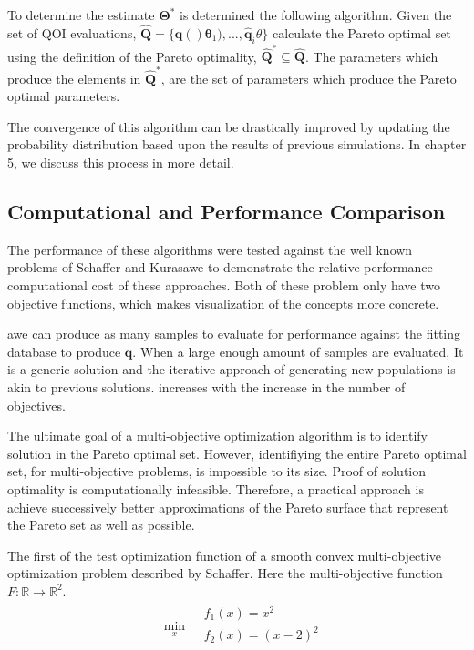To determine the estimate $\bm{\Theta}^*$ is determined the following algorithm.  Given the set of QOI evaluations, $\hat{\bm{Q}}=\{\hat{\bm{q}}()\bm{\theta}_1),...,\hat{\bm{q}}_i{\theta}\}$ calculate the Pareto optimal set using the definition of the Pareto optimality, $\hat{\bm{Q}}^* \subseteq \hat{\bm{Q}}$.   The parameters which produce the elements in $\hat{\bm{Q}}^*$, are the set of parameters which produce the Pareto optimal parameters.

The convergence of this algorithm can be drastically improved by updating the probability distribution based upon the results of previous simulations.  In chapter 5, we discuss this process in more detail.

\subsection{Computational and Performance Comparison}
 The performance of these algorithms were tested against the well known problems of Schaffer\cite{schaffer1984_pareto} and Kurasawe\cite{kursawe1001_pareto} to demonstrate the relative performance computational cost of these approaches.  Both of these problem only have two objective functions, which makes visualization of the concepts more concrete.

 awe can produce as many samples to evaluate for performance against the fitting database to produce $\bm{q}.$  When a large enough amount of samples are evaluated,
 It is a generic solution and the iterative approach of generating new populations is akin to previous solutions.
 increases with the increase in the number of objectives.

 The ultimate goal of a multi-objective optimization algorithm is to identify solution in the Pareto optimal set.  However, identifiying the entire Pareto optimal set, for multi-objective problems, is impossible to its size.  Proof of solution optimality is computationally infeasible.  Therefore, a practical approach is achieve successively better approximations of the Pareto surface that represent the Pareto set as well as possible.

 The first of the test optimization function of a smooth convex multi-objective optimization problem described by Schaffer\cite{schaffer1984_pareto}.  Here the multi-objective function $F:\mathbb{R} \rightarrow \mathbb{R}^2$.
 \begin{equation}
 \begin{aligned}
   &\min_{x}
       \begin{aligned}
            &f_1(x) = x^2 \\
            &f_2(x) = (x-2)^2 \\
       \end{aligned}
 \end{aligned}
 \end{equation}


